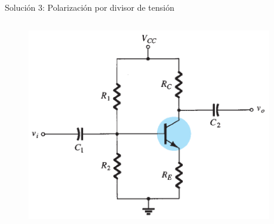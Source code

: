\documentclass[t,aspectratio=169]{beamer}
\begin{document}
\begin{frame}{Solución 3: Polarización por divisor de tensión}

\begin{columns}
\begin{column}{0.5\textwidth}

\begin{figure}
    \centering
    \includegraphics[width=\textwidth]{figures/polarizacion_divisor_tension.png}
\end{figure}

\end{column}
\begin{column}{0.5\textwidth}


\end{column}
\end{columns}

\end{frame}
\end{document}
